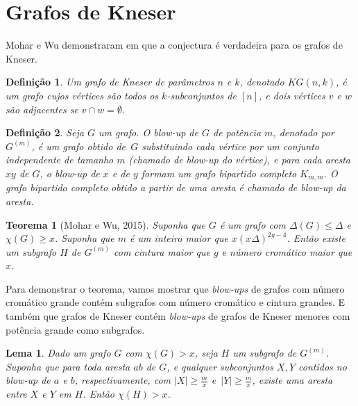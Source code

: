 \documentclass{article}
\newtheorem{teorema}{Teorema}[section]
\newtheorem{lema}{Lema}[teorema]
\newtheorem{definicao}{Definição}[section]
\begin{document}
\section{Grafos de Kneser}
Mohar e Wu demonstraram em \cite{mohar2015triangle} que a conjectura é verdadeira para os grafos de Kneser.

\begin{definicao}
Um grafo de Kneser de parâmetros $n$ e $k$, denotado $KG(n,k)$, é um grafo cujos vértices são todos os $k$-subconjuntos de $[n]$, e dois vértices $v$ e $w$ são adjacentes se $v \cap w = \emptyset$.
\end{definicao}

\begin{definicao}
Seja $G$ um grafo. O \textit{blow-up} de $G$ de potência $m$, denotado por $G^{(m)}$, é um grafo obtido de~$G$ substituindo cada vértice por um conjunto independente de tamanho $m$ (chamado de \textit{blow-up} do vértice), e para cada aresta $xy$ de $G$, o \textit{blow-up} de $x$ e de $y$ formam um grafo bipartido completo $K_{m,m}$. O grafo bipartido completo obtido a partir de uma aresta é chamado de \textit{blow-up} da aresta.
\end{definicao}

\begin{teorema}[Mohar e Wu, 2015]\label{moharwuthm}
Suponha que $G$ é um grafo com $\Delta(G) \leq \Delta$ e $\chi(G) \geq x$. Suponha que $m$ é um inteiro maior que $x(x\Delta)^{2g-4}$. Então existe um subgrafo $H$ de $G^{(m)}$ com cintura maior que $g$ e número cromático maior que $x$.
\end{teorema}

Para demonstrar o teorema, vamos mostrar que \textit{blow-ups} de grafos com número cromático grande contém subgrafos com número cromático e cintura grandes. E também que grafos de Kneser contém \textit{blow-ups} de grafos de Kneser menores com potência grande como subgrafos.
\clearpage
\begin{lema}\label{lemma1kg}
Dado um grafo $G$ com $\chi(G) > x$, seja $H$ um subgrafo de $G^{(m)}$. Suponha que para toda aresta $ab$ de $G$, e qualquer subconjuntos $X,Y$ contidos no \textit{blow-up} de $a$ e $b$, respectivamente, com $|X| \geq \frac{m}{x}$ e~$|Y| \geq \frac{m}{x}$, existe uma aresta entre $X$ e $Y$ em $H$. Então $\chi(H) > x$.
\end{lema}
\end{document}
